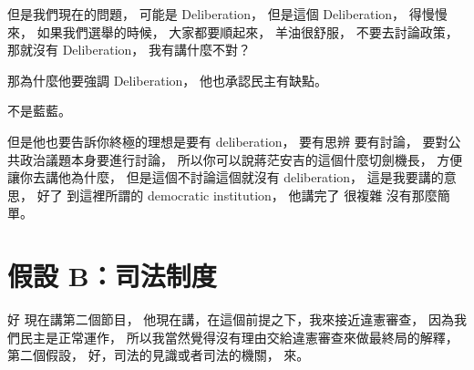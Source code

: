 \hypertarget{w06:cue:1508}{}但是我們現在的問題，
\hypertarget{w06:cue:1509}{}可能是 Deliberation，
\hypertarget{w06:cue:1510}{}但是這個 Deliberation，
\hypertarget{w06:cue:1511}{}得慢慢來，
\hypertarget{w06:cue:1512}{}如果我們選舉的時候，
\hypertarget{w06:cue:1513}{}大家都要順起來，
\hypertarget{w06:cue:1514}{}羊油很舒服，
\hypertarget{w06:cue:1515}{}不要去討論政策，
\hypertarget{w06:cue:1516}{}那就沒有 Deliberation，
\hypertarget{w06:cue:1517}{}我有講什麼不對？

\hypertarget{w06:cue:1518}{}那為什麼他要強調 Deliberation，
\hypertarget{w06:cue:1519}{}他也承認民主有缺點。

\hypertarget{w06:cue:1520}{}不是藍藍。

\hypertarget{w06:cue:1521}{}但是他也要告訴你終極的理想是要有 deliberation，
\hypertarget{w06:cue:1522}{}要有思辨 要有討論，
\hypertarget{w06:cue:1523}{}要對公共政治議題本身要進行討論，
\hypertarget{w06:cue:1524}{}所以你可以說蔣茫安吉的這個什麼切劍機長，
\hypertarget{w06:cue:1525}{}方便讓你去講他為什麼，
\hypertarget{w06:cue:1526}{}但是這個不討論這個就沒有 deliberation，
\hypertarget{w06:cue:1527}{}這是我要講的意思，
\hypertarget{w06:cue:1528}{}好了 到這裡所謂的 democratic institution，
\hypertarget{w06:cue:1529}{}他講完了 很複雜 沒有那麼簡單。

\section{假設 B：司法制度}

\hypertarget{w06:cue:1530}{}好 現在講第二個節目，
\hypertarget{w06:cue:1531}{}他現在講，在這個前提之下，我來接近違憲審查，
\hypertarget{w06:cue:1532}{}因為我們民主是正常運作，
\hypertarget{w06:cue:1533}{}所以我當然覺得沒有理由交給違憲審查來做最終局的解釋，
\hypertarget{w06:cue:1534}{}第二個假設，
\hypertarget{w06:cue:1535}{}好，司法的見識或者司法的機關，
\hypertarget{w06:cue:1536}{}來。


